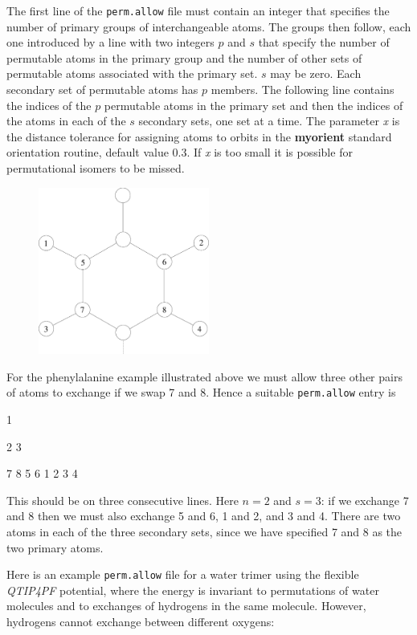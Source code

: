 \documentclass[12pt,a4paper,dvips]{article}
\begin{document}
\begin{itemize}
The first line of the {\tt perm.allow} file must contain an integer
that specifies the number of primary groups of interchangeable atoms.
The groups then follow, each one introduced by a line with two integers $p$ and $s$
that specify the number of permutable atoms in the primary group and the number of other sets
of permutable atoms associated with the primary set.
$s$ may be zero.
Each secondary set of permutable atoms has $p$ members.
The following line contains the indices of the $p$ permutable atoms 
in the primary set and then
the indices of the atoms in each of the $s$ secondary sets, one set at 
a time.
The parameter {\it x} is the distance tolerance for assigning atoms to orbits
in the {\bf myorient} standard orientation routine, default value 0.3.
If {\it x} is too small it is possible for permutational isomers to be missed.

\begin{figure}[h!]
\centerline{\includegraphics[width=0.5\textwidth]{PHE.eps}}
\end{figure}

For the phenylalanine example illustrated above we must allow three other pairs of
atoms to exchange if we swap 7 and 8. Hence a suitable {\tt perm.allow} entry is

{\textrm 1}

{\textrm 2 3}

{\textrm 7 8 5 6 1 2 3 4}

This should be on three consecutive lines.
Here $n=2$ and $s=3$: if we exchange 7 and 8 then we must also exchange 5 and 6,
1 and 2, and 3 and 4. There are two atoms in each of the three secondary sets, 
since we have specified 7 and 8 as the two primary atoms.

Here is an example {\tt perm.allow} file for a water trimer using
the flexible {\it QTIP4PF\/} potential, where the energy is invariant to permutations
of water molecules and to exchanges of hydrogens in the same molecule. However,
hydrogens cannot exchange between different oxygens:


\end{itemize}
\end{document}
